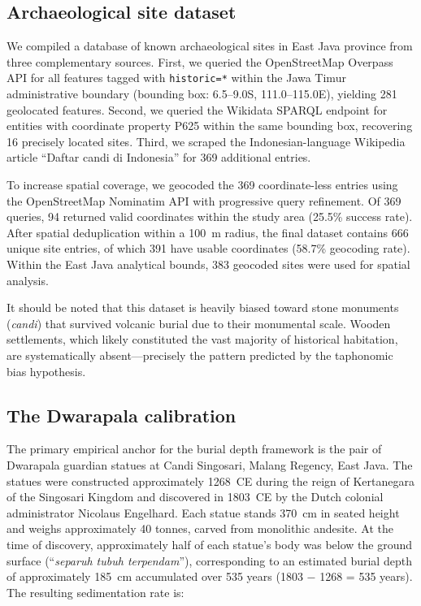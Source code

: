 \documentclass[12pt,a4paper]{article}
\begin{document}
\subsection{Archaeological site dataset}

We compiled a database of known archaeological sites in East Java province from three complementary sources. First, we queried the OpenStreetMap Overpass API for all features tagged with \texttt{historic=*} within the Jawa Timur administrative boundary (bounding box: 6.5--9.0\textdegree{}S, 111.0--115.0\textdegree{}E), yielding 281 geolocated features. Second, we queried the Wikidata SPARQL endpoint for entities with coordinate property P625 within the same bounding box, recovering 16 precisely located sites. Third, we scraped the Indonesian-language Wikipedia article ``Daftar candi di Indonesia'' for 369 additional entries.

To increase spatial coverage, we geocoded the 369 coordinate-less entries using the OpenStreetMap Nominatim API with progressive query refinement. Of 369 queries, 94 returned valid coordinates within the study area (25.5\% success rate). After spatial deduplication within a 100~m radius, the final dataset contains 666 unique site entries, of which 391 have usable coordinates (58.7\% geocoding rate). Within the East Java analytical bounds, 383 geocoded sites were used for spatial analysis.

It should be noted that this dataset is heavily biased toward stone monuments (\textit{candi}) that survived volcanic burial due to their monumental scale. Wooden settlements, which likely constituted the vast majority of historical habitation, are systematically absent---precisely the pattern predicted by the taphonomic bias hypothesis.

\subsection{The Dwarapala calibration}

The primary empirical anchor for the burial depth framework is the pair of Dwarapala guardian statues at Candi Singosari, Malang Regency, East Java. The statues were constructed approximately 1268~CE during the reign of Kertanegara of the Singosari Kingdom and discovered in 1803~CE by the Dutch colonial administrator Nicolaus Engelhard. Each statue stands 370~cm in seated height and weighs approximately 40 tonnes, carved from monolithic andesite. At the time of discovery, approximately half of each statue's body was below the ground surface (``\textit{separuh tubuh terpendam}''), corresponding to an estimated burial depth of approximately 185~cm accumulated over 535 years (1803 $-$ 1268 = 535 years). The resulting sedimentation rate is:
\end{document}

